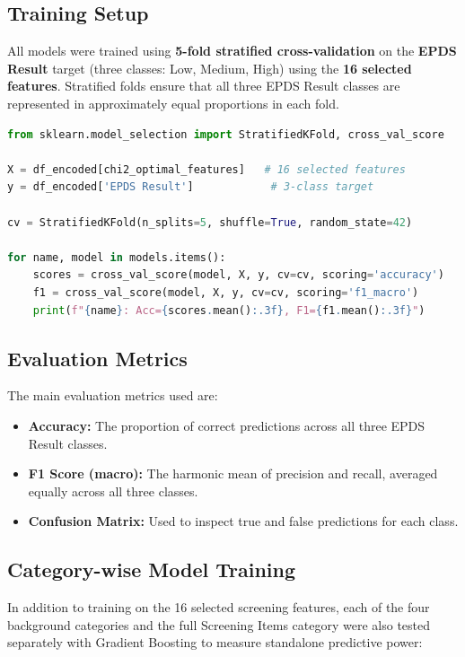 \subsection{Training Setup}

All models were trained using \textbf{5-fold stratified cross-validation} on the \textbf{EPDS Result} target (three classes: Low, Medium, High) using the \textbf{16 selected features}. Stratified folds ensure that all three EPDS Result classes are represented in approximately equal proportions in each fold.

\begin{lstlisting}[language=Python, caption={5-fold cross-validation setup on EPDS Result.}]
from sklearn.model_selection import StratifiedKFold, cross_val_score

X = df_encoded[chi2_optimal_features]   # 16 selected features
y = df_encoded['EPDS Result']            # 3-class target

cv = StratifiedKFold(n_splits=5, shuffle=True, random_state=42)

for name, model in models.items():
    scores = cross_val_score(model, X, y, cv=cv, scoring='accuracy')
    f1 = cross_val_score(model, X, y, cv=cv, scoring='f1_macro')
    print(f"{name}: Acc={scores.mean():.3f}, F1={f1.mean():.3f}")
\end{lstlisting}

\subsection{Evaluation Metrics}

The main evaluation metrics used are:
\begin{itemize}
    \item \textbf{Accuracy:} The proportion of correct predictions across all three EPDS Result classes.
    \item \textbf{F1 Score (macro):} The harmonic mean of precision and recall, averaged equally across all three classes.
    \item \textbf{Confusion Matrix:} Used to inspect true and false predictions for each class.
\end{itemize}

\subsection{Category-wise Model Training}
\label{ch3-subsec-category}

In addition to training on the 16 selected screening features, each of the four background categories and the full Screening Items category were also tested separately with Gradient Boosting to measure standalone predictive power:

